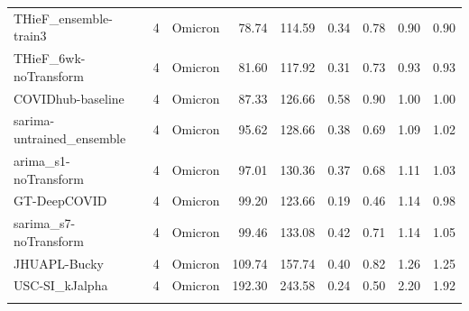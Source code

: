 \documentclass[12pt]{article}
\begin{document}
\begin{longtable}{lrlrrrrrr}
  THieF\_ensemble-train3 & 4 & Omicron & 78.74 & 114.59 & 0.34 & 0.78 & 0.90 & 0.90 \\ 
  THieF\_6wk-noTransform & 4 & Omicron & 81.60 & 117.92 & 0.31 & 0.73 & 0.93 & 0.93 \\ 
  COVIDhub-baseline & 4 & Omicron & 87.33 & 126.66 & 0.58 & 0.90 & 1.00 & 1.00 \\ 
  sarima-untrained\_ensemble & 4 & Omicron & 95.62 & 128.66 & 0.38 & 0.69 & 1.09 & 1.02 \\ 
  arima\_s1-noTransform & 4 & Omicron & 97.01 & 130.36 & 0.37 & 0.68 & 1.11 & 1.03 \\ 
  GT-DeepCOVID & 4 & Omicron & 99.20 & 123.66 & 0.19 & 0.46 & 1.14 & 0.98 \\ 
  sarima\_s7-noTransform & 4 & Omicron & 99.46 & 133.08 & 0.42 & 0.71 & 1.14 & 1.05 \\ 
  JHUAPL-Bucky & 4 & Omicron & 109.74 & 157.74 & 0.40 & 0.82 & 1.26 & 1.25 \\ 
  USC-SI\_kJalpha & 4 & Omicron & 192.30 & 243.58 & 0.24 & 0.50 & 2.20 & 1.92 \\ 
   \hline
\hline
\label{tab:table_wave_states}
\end{longtable}
\endgroup

\newpage
\end{document}
